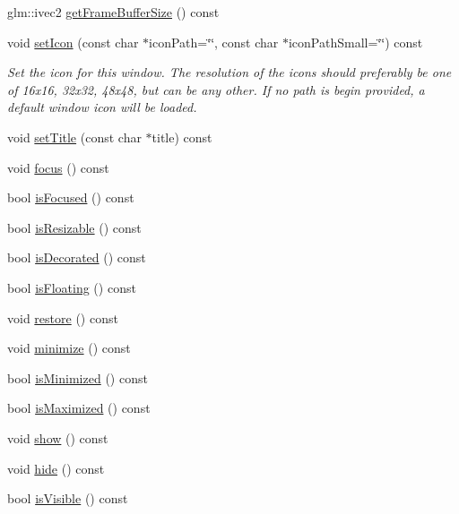 \begin{DoxyCompactItemize}
\item 
glm\+::ivec2 \mbox{\hyperlink{classec_1_1_window_a855a303eca483fc69ad278df77f1de4c}{get\+Frame\+Buffer\+Size}} () const
\item 
void \mbox{\hyperlink{classec_1_1_window_a906d0c0d6b6c50bb98de694b5a09dc17}{set\+Icon}} (const char $\ast$icon\+Path=\char`\"{}\char`\"{}, const char $\ast$icon\+Path\+Small=\char`\"{}\char`\"{}) const
\begin{DoxyCompactList}\small\item\em Set the icon for this window. The resolution of the icons should preferably be one of 16x16, 32x32, 48x48, but can be any other. If no path is begin provided, a default window icon will be loaded. \end{DoxyCompactList}\item 
void \mbox{\hyperlink{classec_1_1_window_aad364a4e56d55628c91deffa1a3a64d7}{set\+Title}} (const char $\ast$title) const
\item 
void \mbox{\hyperlink{classec_1_1_window_a927c041d6913c385efef327b091d5f4f}{focus}} () const
\item 
bool \mbox{\hyperlink{classec_1_1_window_ac40c6391e9edd720407f8a77d4ee546a}{is\+Focused}} () const
\item 
bool \mbox{\hyperlink{classec_1_1_window_a8af5e954522cc427ab1fe5b6a28f5328}{is\+Resizable}} () const
\item 
bool \mbox{\hyperlink{classec_1_1_window_a2761ae9079a18f5d62b2ed4715fd9bd1}{is\+Decorated}} () const
\item 
bool \mbox{\hyperlink{classec_1_1_window_a8e0c04a4c922d351246af64a5d439ba3}{is\+Floating}} () const
\item 
void \mbox{\hyperlink{classec_1_1_window_a30b3a1e8d3b0f8ae82ee9e4e0235f174}{restore}} () const
\item 
void \mbox{\hyperlink{classec_1_1_window_a03862c4545b0ad415438f4b8c26849ef}{minimize}} () const
\item 
bool \mbox{\hyperlink{classec_1_1_window_aa9de125288991354fdeb781e6d3f7a12}{is\+Minimized}} () const
\item 
bool \mbox{\hyperlink{classec_1_1_window_aa4a8cfb938d1a28864e8d0cc265dd96e}{is\+Maximized}} () const
\item 
void \mbox{\hyperlink{classec_1_1_window_abedfe871ebba65fa932f2eb9117373a0}{show}} () const
\item 
void \mbox{\hyperlink{classec_1_1_window_ae03af70ef60b666e60533ede07fad8cf}{hide}} () const
\item 
bool \mbox{\hyperlink{classec_1_1_window_a0f4ab1e221cbf5ce5b5a1183a51e38cd}{is\+Visible}} () const

\end{DoxyCompactItemize}
